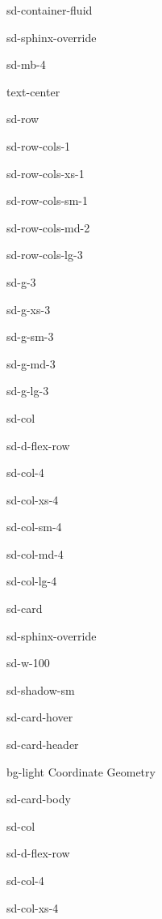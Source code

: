 \documentclass[letterpaper,10pt,english]{jupyterBook}
\let\sphinxpxdimen\pdfpxdimen\else\newdimen\sphinxpxdimen
\begin{document}
\begin{sphinxuseclass}{sd-container-fluid}
\begin{sphinxuseclass}{sd-sphinx-override}
\begin{sphinxuseclass}{sd-mb-4}
\begin{sphinxuseclass}{text-center}
\begin{sphinxuseclass}{sd-row}
\begin{sphinxuseclass}{sd-row-cols-1}
\begin{sphinxuseclass}{sd-row-cols-xs-1}
\begin{sphinxuseclass}{sd-row-cols-sm-1}
\begin{sphinxuseclass}{sd-row-cols-md-2}
\begin{sphinxuseclass}{sd-row-cols-lg-3}
\begin{sphinxuseclass}{sd-g-3}
\begin{sphinxuseclass}{sd-g-xs-3}
\begin{sphinxuseclass}{sd-g-sm-3}
\begin{sphinxuseclass}{sd-g-md-3}
\begin{sphinxuseclass}{sd-g-lg-3}
\begin{sphinxuseclass}{sd-col}
\begin{sphinxuseclass}{sd-d-flex-row}
\begin{sphinxuseclass}{sd-col-4}
\begin{sphinxuseclass}{sd-col-xs-4}
\begin{sphinxuseclass}{sd-col-sm-4}
\begin{sphinxuseclass}{sd-col-md-4}
\begin{sphinxuseclass}{sd-col-lg-4}
\begin{sphinxuseclass}{sd-card}
\begin{sphinxuseclass}{sd-sphinx-override}
\begin{sphinxuseclass}{sd-w-100}
\begin{sphinxuseclass}{sd-shadow-sm}
\begin{sphinxuseclass}{sd-card-hover}
\begin{sphinxuseclass}{sd-card-header}
\begin{sphinxuseclass}{bg-light}
\sphinxAtStartPar
Co\sphinxhyphen{}ordinate Geometry

\end{sphinxuseclass}
\end{sphinxuseclass}
\begin{sphinxuseclass}{sd-card-body}
\begin{figure}[htbp]
\centering

\noindent\sphinxincludegraphics[width=250\sphinxpxdimen]{{4_line_line_distance}.png}
\end{figure}

\end{sphinxuseclass}{\hyperref[\detokenize{_pages/4.0_Coordinate_geometry::doc}]{}}
\end{sphinxuseclass}
\end{sphinxuseclass}
\end{sphinxuseclass}
\end{sphinxuseclass}
\end{sphinxuseclass}
\end{sphinxuseclass}
\end{sphinxuseclass}
\end{sphinxuseclass}
\end{sphinxuseclass}
\end{sphinxuseclass}
\end{sphinxuseclass}
\end{sphinxuseclass}
\begin{sphinxuseclass}{sd-col}
\begin{sphinxuseclass}{sd-d-flex-row}
\begin{sphinxuseclass}{sd-col-4}
\begin{sphinxuseclass}{sd-col-xs-4}

\end{sphinxuseclass}
\end{sphinxuseclass}
\end{sphinxuseclass}
\end{sphinxuseclass}
\end{sphinxuseclass}
\end{sphinxuseclass}
\end{sphinxuseclass}
\end{sphinxuseclass}
\end{sphinxuseclass}
\end{sphinxuseclass}
\end{sphinxuseclass}
\end{sphinxuseclass}
\end{sphinxuseclass}
\end{sphinxuseclass}
\end{sphinxuseclass}
\end{sphinxuseclass}
\end{sphinxuseclass}
\end{sphinxuseclass}
\end{sphinxuseclass}
\end{document}
